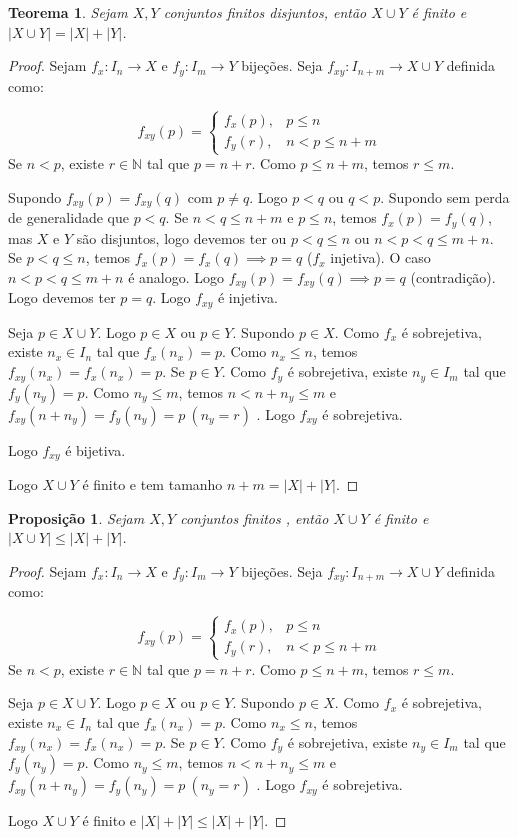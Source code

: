 \documentclass{article}
\newtheorem{prop}{Proposição}[section]
\theoremstyle{theorem}
\newtheorem{teo}{Teorema}
\theoremstyle{lemma}
\theoremstyle{definition}
\theoremstyle{remark}
\begin{document}
\begin{teo}
	Sejam $X,Y$ conjuntos finitos disjuntos, então $X\cup Y$ é finito e $|X\cup Y| = |X| + |Y|$.
\end{teo}
\begin{proof}
	Sejam $f_x : I_n \to X$ e $f_y : I_m \to Y$ bijeções.
	Seja $f_{xy}: I_{n+m} \to X\cup Y$ definida como: 

	$$ f_{xy}(p) = \begin{cases} f_x(p), & p\leq n \\ f_y(r), &n <  p \leq n+m    \end{cases} $$
	Se $n <p$, existe $r \in \mathbb{N}$ tal que $p = n+r$. Como $p \leq n+m$, temos $r \leq m$.

	Supondo $f_{xy}(p) = f_{xy}(q)$ com $p\neq q$. Logo $p<q$ ou $q<p$. Supondo sem perda de generalidade que $p<q$. Se $n < q \leq n+m$ e $p \leq n$, temos $f_x(p) = f_y(q)$, mas $X$ e $Y$ são disjuntos, logo  devemos ter ou $p < q \leq n$  ou $n < p < q \leq m+n$. Se $ p < q \leq n$, temos $f_x(p) = f_x(q) \implies p = q$ ($f_x$ injetiva). O caso $ n < p < q \leq m+n$ é analogo. Logo $f_{xy}(p) = f_{xy}(q) \implies p = q$ (contradição). Logo devemos ter  $p = q$. Logo $f_{xy}$ é injetiva.

	Seja $p\in X\cup Y$. Logo $p\in X$ ou $p\in Y$. Supondo $p\in X$. Como $f_x$ é sobrejetiva, existe $n_x \in I_n$ tal que $f_x(n_x) = p$. Como $n_x\leq n$, temos $f_{xy}(n_x) = f_x(n_x) = p$.  Se  $p\in Y$. Como $f_y$ é sobrejetiva, existe $n_y \in I_m$ tal que $f_y(n_y) = p$. Como $n_y\leq m$, temos $ n < n+n_y \leq m $  e $f_{xy}(n+n_y) = f_y(n_y) = p \: (n_y = r)$ . Logo $f_{xy}$ é sobrejetiva.
	
	Logo $f_{xy}$ é bijetiva.

	Logo $X\cup Y$ é finito e tem tamanho $n+m = |X| + |Y|$.


	
\end{proof}
\begin{prop}
	Sejam $X,Y$ conjuntos finitos , então $X\cup Y$ é finito e $|X\cup Y| \leq |X| + |Y|$.
\end{prop}
\begin{proof}
	Sejam $f_x : I_n \to X$ e $f_y : I_m \to Y$ bijeções.
	Seja $f_{xy}: I_{n+m} \to X\cup Y$ definida como: 

	$$ f_{xy}(p) = \begin{cases} f_x(p), & p\leq n \\ f_y(r), &n <  p \leq n+m    \end{cases} $$
	Se $n <p$, existe $r \in \mathbb{N}$ tal que $p = n+r$. Como $p \leq n+m$, temos $r \leq m$.


	Seja $p\in X\cup Y$. Logo $p\in X$ ou $p\in Y$. Supondo $p\in X$. Como $f_x$ é sobrejetiva, existe $n_x \in I_n$ tal que $f_x(n_x) = p$. Como $n_x\leq n$, temos $f_{xy}(n_x) = f_x(n_x) = p$.  Se  $p\in Y$. Como $f_y$ é sobrejetiva, existe $n_y \in I_m$ tal que $f_y(n_y) = p$. Como $n_y\leq m$, temos $ n < n+n_y \leq m $  e $f_{xy}(n+n_y) = f_y(n_y) = p \: (n_y = r)$ . Logo $f_{xy}$ é sobrejetiva.
	

	Logo $X\cup Y$ é finito e $|X| + |Y| \leq |X| + |Y|$.

\end{proof}
\end{document}
